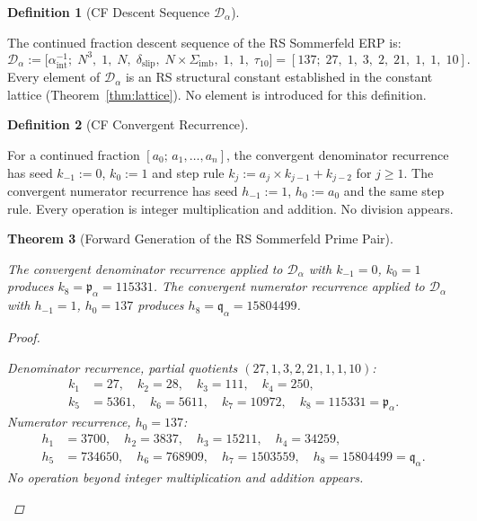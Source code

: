 \documentclass[11pt,letterpaper]{article}
\theoremstyle{plain}
\newtheorem{theorem}{Theorem}[section]
\theoremstyle{definition}
\newtheorem{definition}[theorem]{Definition}
\theoremstyle{remark}
\newcommand{\Sigimb}{\Sigma_{\mathrm{imb}}}
\newcommand{\dslip}{\delta_{\mathrm{slip}}}
\newcommand{\tauX}{\tau_{10}}
\newcommand{\aSC}{\alpha^{-1}_{\mathrm{int}}}
\newcommand{\pa}{\mathfrak{p}_\alpha}
\newcommand{\qa}{\mathfrak{q}_\alpha}
\newcommand{\Da}{\mathcal{D}_\alpha}
\begin{document}
\begin{definition}[CF Descent Sequence $\Da$]\label{def:Da}
\begin{rsbox}
The continued fraction descent sequence of the RS Sommerfeld ERP is:
\[
\Da:=\bigl[\aSC;\;N^3,\;1,\;N,\;\dslip,\;N\times\Sigimb,\;
1,\;1,\;\tauX\bigr]=[137;\;27,\;1,\;3,\;2,\;21,\;1,\;1,\;10].
\]
Every element of $\Da$ is an RS structural constant established in
the constant lattice (Theorem~\ref{thm:lattice}).  No element is
introduced for this definition.
\end{rsbox}
\end{definition}

\begin{definition}[CF Convergent Recurrence]\label{def:cf-rec}
\begin{rsbox}
For a continued fraction $[a_0;\,a_1,\ldots,a_n]$, the convergent
denominator recurrence has seed $k_{-1}:=0$, $k_0:=1$ and step rule
$k_j:=a_j\times k_{j-1}+k_{j-2}$ for $j\geq1$.  The convergent
numerator recurrence has seed $h_{-1}:=1$, $h_0:=a_0$ and the same
step rule.  Every operation is integer multiplication and addition.
No division appears.
\end{rsbox}
\end{definition}

\begin{theorem}[Forward Generation of the RS Sommerfeld Prime
Pair]\label{thm:sommerfeld-forward}
\begin{rsbox}
The convergent denominator recurrence applied to $\Da$ with
$k_{-1}=0$, $k_0=1$ produces $k_8=\pa=115331$.  The convergent
numerator recurrence applied to $\Da$ with $h_{-1}=1$, $h_0=137$
produces $h_8=\qa=15804499$.
\end{rsbox}
\begin{proof}
\begin{rsbox}
Denominator recurrence, partial quotients $(27,1,3,2,21,1,1,10)$:
\begin{align*}
k_1&=27,\quad k_2=28,\quad k_3=111,\quad k_4=250,\\
k_5&=5361,\quad k_6=5611,\quad k_7=10972,\quad k_8=115331=\pa.
\end{align*}
Numerator recurrence, $h_0=137$:
\begin{align*}
h_1&=3700,\quad h_2=3837,\quad h_3=15211,\quad h_4=34259,\\
h_5&=734650,\quad h_6=768909,\quad h_7=1503559,\quad h_8=15804499=\qa.
\end{align*}
No operation beyond integer multiplication and addition appears.
\end{rsbox}
\end{proof}
\end{theorem}
\end{document}
